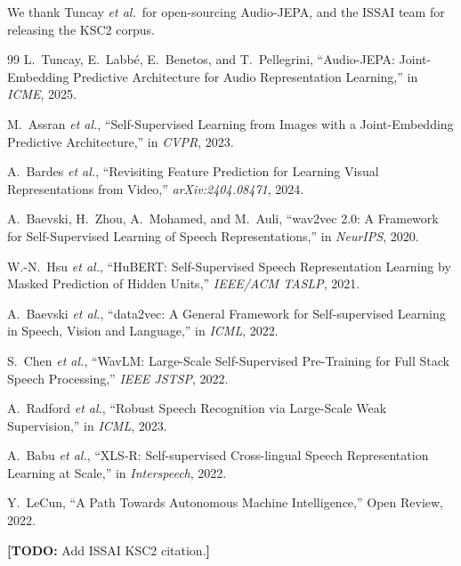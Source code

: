 \documentclass[conference]{IEEEtran}
\newcommand{\todo}[1]{{\color{red}\textbf{[TODO:} #1\textbf{]}}}
\begin{document}
We thank Tuncay \emph{et al.}\ for open-sourcing Audio-JEPA, and the ISSAI team for releasing the KSC2 corpus.

\begin{thebibliography}{99}
L.~Tuncay, E.~Labbé, E.~Benetos, and T.~Pellegrini,
``Audio-JEPA: Joint-Embedding Predictive Architecture for Audio Representation Learning,''
in \emph{ICME}, 2025.

M.~Assran \emph{et al.},
``Self-Supervised Learning from Images with a Joint-Embedding Predictive Architecture,''
in \emph{CVPR}, 2023.

A.~Bardes \emph{et al.},
``Revisiting Feature Prediction for Learning Visual Representations from Video,''
\emph{arXiv:2404.08471}, 2024.

A.~Baevski, H.~Zhou, A.~Mohamed, and M.~Auli,
``wav2vec 2.0: A Framework for Self-Supervised Learning of Speech Representations,''
in \emph{NeurIPS}, 2020.

W.-N.~Hsu \emph{et al.},
``HuBERT: Self-Supervised Speech Representation Learning by Masked Prediction of Hidden Units,''
\emph{IEEE/ACM TASLP}, 2021.

A.~Baevski \emph{et al.},
``data2vec: A General Framework for Self-supervised Learning in Speech, Vision and Language,''
in \emph{ICML}, 2022.

S.~Chen \emph{et al.},
``WavLM: Large-Scale Self-Supervised Pre-Training for Full Stack Speech Processing,''
\emph{IEEE JSTSP}, 2022.

A.~Radford \emph{et al.},
``Robust Speech Recognition via Large-Scale Weak Supervision,''
in \emph{ICML}, 2023.

A.~Babu \emph{et al.},
``XLS-R: Self-supervised Cross-lingual Speech Representation Learning at Scale,''
in \emph{Interspeech}, 2022.

Y.~LeCun,
``A Path Towards Autonomous Machine Intelligence,''
Open Review, 2022.

\todo{Add ISSAI KSC2 citation.}

\end{thebibliography}
\end{document}
